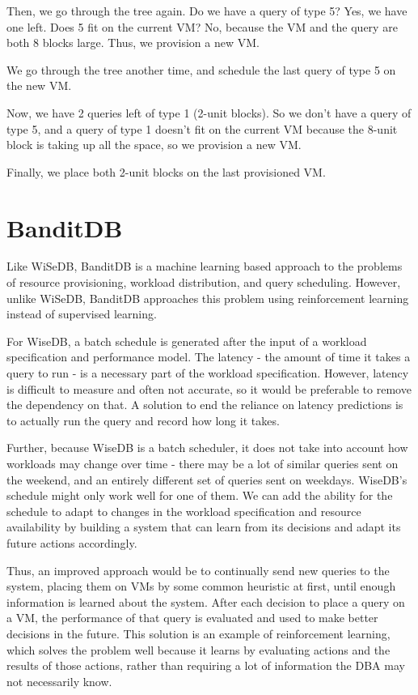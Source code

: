 \documentclass{brandiss}
\numberwithin{section}{chapter}
\numberwithin{figure}{chapter}
\theoremstyle{definition}
\theoremstyle{plain}
\theoremstyle{remark}
\begin{document}
Then, we go through the tree again. Do we have a query of type 5? Yes, we have one left. Does 5 fit on the current VM? No, because the VM and the query are both 8 blocks large. Thus, we provision a new VM.

We go through the tree another time, and schedule the last query of type 5 on the new VM.

Now, we have 2 queries left of type 1 (2-unit blocks). So we don't have a query of type 5, and a query of type 1 doesn't fit on the current VM because the 8-unit block is taking up all the space, so we provision a new VM.

Finally, we place both 2-unit blocks on the last provisioned VM.

\chapter{BanditDB}

Like WiSeDB, BanditDB is a machine learning based approach to the problems of resource provisioning, workload distribution, and query scheduling. However, unlike WiSeDB, BanditDB approaches this problem using reinforcement learning instead of supervised learning.

For WiseDB, a batch schedule is generated after the input of a workload specification and performance model. The latency - the amount of time it takes a query to run - is a necessary part of the workload specification. However, latency is difficult to measure and often not accurate, so it would be preferable to remove the dependency on that. A solution to end the reliance on latency predictions is to actually run the query and record how long it takes.

Further, because WiseDB is a batch scheduler, it does not take into account how workloads may change over time - there may be a lot of similar queries sent on the weekend, and an entirely different set of queries sent on weekdays. WiseDB's schedule might only work well for one of them. We can add the ability for the schedule to adapt to changes in the workload specification and resource availability by building a system that can learn from its decisions and adapt its future actions accordingly.

Thus, an improved approach would be to continually send new queries to the system, placing them on VMs by some common heuristic at first, until enough information is learned about the system. After each decision to place a query on a VM, the performance of that query is evaluated and used to make better decisions in the future. This solution is an example of reinforcement learning, which solves the problem well because it learns by evaluating actions and the results of those actions, rather than requiring a lot of information the DBA may not necessarily know.
\end{document}
